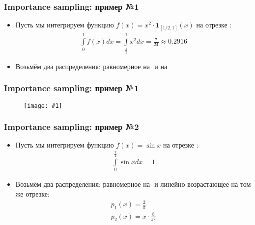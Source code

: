 \documentclass[handout,10pt]{beamer}
\newcommand{\slideimage}[1]{
  \begin{figure}
    \begin{adjustbox}{width=\textwidth, totalheight=\textheight-2\baselineskip-2\baselineskip,keepaspectratio}
      \texttt{[image: \#1]}
    \end{adjustbox}
  \end{figure}
}
\begin{document}
\begin{frame}
\frametitle{Importance sampling: пример №1}
\begin{itemize}
\item Пусть мы интегрируем функцию \begin{math}f(x) = x^2 \cdot \mathbf{1}_{[1/2, 1]}(x)\end{math} на отрезке \begin{math}[0, 1]\end{math}:
\begin{gather*}
\int\limits_0^1f(x)dx = \int\limits_\frac{1}{2}^1 x^2dx = \frac{7}{24}\approx 0.2916
\end{gather*}
\pause
\item Возьмём два распределения: равномерное на \begin{math}[0, 1]\end{math} и на \begin{math}[1/2. 1]\end{math}
\end{itemize}
\end{frame}

\begin{frame}
\frametitle{Importance sampling: пример №1}
\slideimage{is_plot_1.png}
\end{frame}

\begin{frame}
\frametitle{Importance sampling: пример №2}
\begin{itemize}
\item Пусть мы интегрируем функцию \begin{math}f(x) = \sin x\end{math} на отрезке \begin{math}[0, \frac{\pi}{2}]\end{math}:
\begin{gather*}
\int\limits_0^\frac{\pi}{2} \sin x dx = 1
\end{gather*}
\pause
\item Возьмём два распределения: равномерное на \begin{math}[0, \frac{\pi}{2}]\end{math} и линейно возрастающее на том же отрезке:
\begin{gather*}
p_1(x) = \frac{2}{\pi} \\
p_2(x) = x \cdot \frac{8}{\pi^2} \\
\end{gather*}
\end{itemize}
\end{frame}
\end{document}
